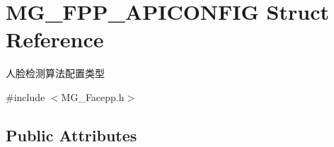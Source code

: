 \hypertarget{struct_m_g___f_p_p___a_p_i_c_o_n_f_i_g}{}\section{M\+G\+\_\+\+F\+P\+P\+\_\+\+A\+P\+I\+C\+O\+N\+F\+IG Struct Reference}
\label{struct_m_g___f_p_p___a_p_i_c_o_n_f_i_g}


人脸检测算法配置类型  




{\ttfamily \#include $<$M\+G\+\_\+\+Facepp.\+h$>$}

\subsection*{Public Attributes}
